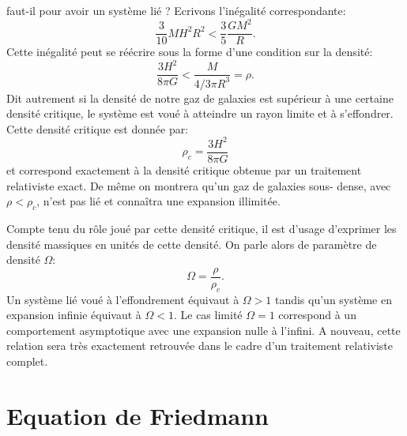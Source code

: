  faut-il pour avoir un système lié ? Ecrivons l'inégalité correspondante:
\begin{equation}
\frac{3}{10} M H^2 R^2 <\frac{3}{5}\frac{GM^2}{R}.
\end{equation}
Cette inégalité peut se réécrire sous la forme d'une condition sur la densité:
\begin{equation}
\frac{3H^2}{8\pi G}< \frac{M}{4/3\pi R^3}=\rho.
\end{equation}
Dit autrement si la densité de notre gaz de galaxies est supérieur à une certaine densité critique, le système est voué à atteindre un rayon limite et à s'effondrer. Cette densité critique  est donnée par:
\begin{equation}
\rho_c =\frac{3H^2}{8\pi G}
\end{equation}
et correspond exactement à la densité critique obtenue par un traitement relativiste exact. De même on montrera qu'un gaz de galaxies sous- dense, avec $\rho< \rho_c$, n'est pas lié et  connaîtra une expansion illimitée. 

Compte tenu du rôle joué par cette densité critique, il est d'usage d'exprimer les densité massiques en unités de cette densité. On parle alors de paramètre de densité  $\Omega$:
\begin{equation}
\Omega=\frac{\rho}{\rho_c}.
\end{equation}
Un système lié voué à l'effondrement équivaut à $\Omega>1$ tandis qu'un système en expansion infinie équivaut à $\Omega<1$. Le cas limité $\Omega=1$ correspond à un comportement asymptotique avec une expansion nulle à l'infini. A nouveau, cette relation sera très exactement retrouvée dans le cadre d'un traitement relativiste complet.

\section{Equation de Friedmann}

